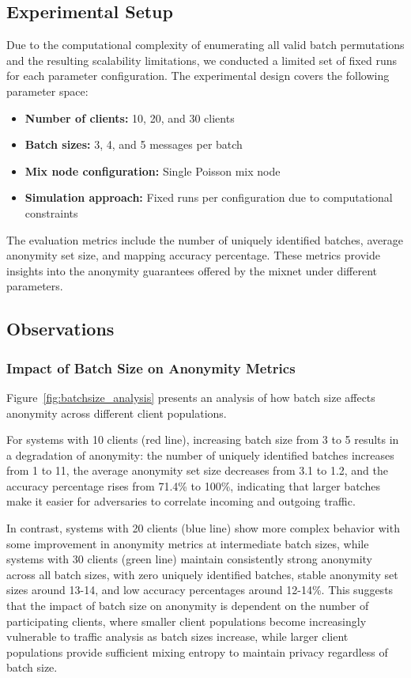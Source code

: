 \documentclass{article}
\begin{document}
\subsection{Experimental Setup}

Due to the computational complexity of enumerating all valid batch 
permutations and the resulting scalability limitations, we 
conducted a limited set of fixed runs for each parameter 
configuration. The experimental design covers the following 
parameter space:

\begin{itemize}
\item \textbf{Number of clients:} 10, 20, and 30 clients
\item \textbf{Batch sizes:} 3, 4, and 5 messages per batch
\item \textbf{Mix node configuration:} Single Poisson mix node
\item \textbf{Simulation approach:} Fixed runs per configuration 
due to computational constraints
\end{itemize}

The evaluation metrics include the number of uniquely identified 
batches, average anonymity set size, and mapping accuracy percentage. 
These metrics provide insights into the anonymity guarantees offered 
by the mixnet under different parameters.

\subsection{Observations}

\subsubsection{Impact of Batch Size on Anonymity Metrics}

Figure~\ref{fig:batchsize_analysis} presents an analysis 
of how batch size affects anonymity across different 
client populations. 

For systems with 10 clients 
(red line), increasing batch size from 3 to 5 results in a 
degradation of anonymity: the number of uniquely 
identified batches increases from 1 to 11, the 
average anonymity set size decreases from 3.1 to 1.2, and the 
accuracy percentage rises from 71.4\% to 100\%, 
indicating that larger batches make it easier for 
adversaries to correlate incoming and outgoing traffic. 

In contrast, systems with 20 clients (blue line) show more 
complex behavior with some improvement in anonymity metrics 
at intermediate batch sizes, while systems with 30 clients 
(green line) maintain consistently strong anonymity across 
all batch sizes, with zero uniquely identified batches, 
stable anonymity set sizes around 13-14, and low accuracy 
percentages around 12-14\%. This suggests that the impact 
of batch size on anonymity is dependent on the number 
of participating clients, where smaller client populations 
become increasingly vulnerable to traffic analysis as batch 
sizes increase, while larger client populations provide 
sufficient mixing entropy to maintain privacy regardless 
of batch size.
\end{document}
